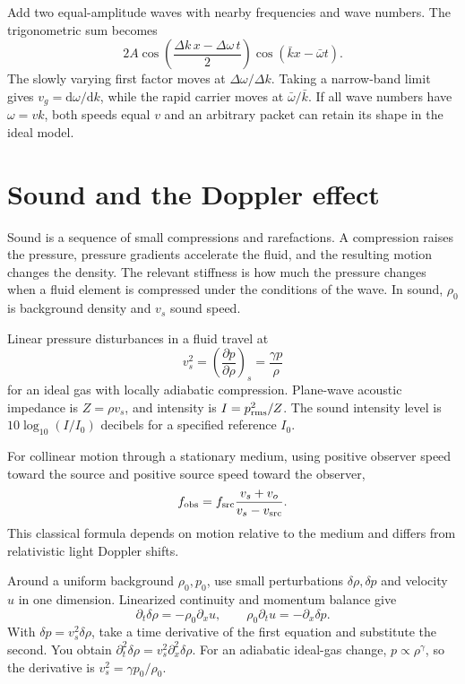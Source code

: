 \documentclass[11pt,oneside]{book}
\newcommand{\dd}{\mathrm{d}}
\newcommand{\pd}[2]{\frac{\partial #1}{\partial #2}}
\theoremstyle{reviewstyle}
\begin{document}
Add two equal-amplitude waves with nearby frequencies and wave numbers. The trigonometric sum becomes
\begin{equation}
2A\cos\left(\frac{\Delta k\,x-\Delta\omega\,t}{2}\right)
\cos(\bar kx-\bar\omega t).
\end{equation}
The slowly varying first factor moves at $\Delta\omega/\Delta k$. Taking a narrow-band limit gives $v_g=\dd\omega/\dd k$, while the rapid carrier moves at $\bar\omega/\bar k$. If all wave numbers have $\omega=vk$, both speeds equal $v$ and an arbitrary packet can retain its shape in the ideal model.

\section{Sound and the Doppler effect}
Sound is a sequence of small compressions and rarefactions. A compression raises the pressure, pressure gradients accelerate the fluid, and the resulting motion changes the density. The relevant stiffness is how much the pressure changes when a fluid element is compressed under the conditions of the wave. In sound, $\rho_0$ is background density and $v_s$ sound speed.

Linear pressure disturbances in a fluid travel at
\begin{equation}
v_s^2=\left(\pd{p}{\rho}\right)_s=\frac{\gamma p}{\rho}
\end{equation}
for an ideal gas with locally adiabatic compression. Plane-wave acoustic impedance is $Z=\rho v_s$, and intensity is $I=p_{\rm rms}^2/Z$. The sound intensity level is $10\log_{10}(I/I_0)$ decibels for a specified reference $I_0$.

For collinear motion through a stationary medium, using positive observer speed toward the source and positive source speed toward the observer,
\begin{equation}f_{\rm obs}=f_{\rm src}\frac{v_s+v_o}{v_s-v_{\rm src}}.\end{equation}
This classical formula depends on motion relative to the medium and differs from relativistic light Doppler shifts.

Around a uniform background $\rho_0,p_0$, use small perturbations $\delta\rho,\delta p$ and velocity $u$ in one dimension. Linearized continuity and momentum balance give
\begin{equation}
\partial_t\delta\rho=-\rho_0\partial_xu,\qquad
\rho_0\partial_tu=-\partial_x\delta p.
\end{equation}
With $\delta p=v_s^2\delta\rho$, take a time derivative of the first equation and substitute the second. You obtain $\partial_t^2\delta\rho=v_s^2\partial_x^2\delta\rho$. For an adiabatic ideal-gas change, $p\propto\rho^\gamma$, so the derivative is $v_s^2=\gamma p_0/\rho_0$.
\end{document}
